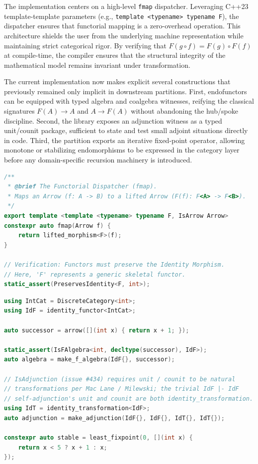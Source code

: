 \documentclass[11pt, a4paper]{report}
\begin{document}
The implementation centers on a high-level \texttt{fmap} dispatcher. Leveraging C++23 template-template parameters (e.g., \texttt{template <typename> typename F}), the dispatcher ensures that functorial mapping is a zero-overhead operation. This architecture shields the user from the underlying machine representation while maintaining strict categorical rigor. By verifying that $F(g \circ f) = F(g) \circ F(f)$ at compile-time, the compiler ensures that the structural integrity of the mathematical model remains invariant under transformation.

The current implementation now makes explicit several constructions that previously remained only implicit in downstream partitions. First, endofunctors can be equipped with typed algebra and coalgebra witnesses, reifying the classical signatures $F(A) \to A$ and $A \to F(A)$ without abandoning the hub/spoke discipline. Second, the library exposes an adjunction witness as a typed unit/counit package, sufficient to state and test small adjoint situations directly in code. Third, the partition exports an iterative fixed-point operator, allowing monotone or stabilizing endomorphisms to be expressed in the category layer before any domain-specific recursion machinery is introduced.

\begin{lstlisting}[language=C++, caption={Functorial Mapping: Mappings as zero-overhead dispatchers.}, label={lst:functor_fmap}]
/** 
 * @brief The Functorial Dispatcher (fmap).
 * Maps an Arrow (f: A -> B) to a lifted Arrow (F(f): F<A> -> F<B>).
 */
export template <template <typename> typename F, IsArrow Arrow>
constexpr auto fmap(Arrow f) {
    return lifted_morphism<F>(f);
}

// Verification: Functors must preserve the Identity Morphism.
// Here, 'F' represents a generic skeletal functor.
static_assert(PreservesIdentity<F, int>);
\end{lstlisting}

\begin{lstlisting}[language=C++, caption={Endofunctor algebras, adjunction witnesses, and fixed points.}, label={lst:functor_algebra_fixpoint}]
using IntCat = DiscreteCategory<int>;
using IdF = identity_functor<IntCat>;

auto successor = arrow([](int x) { return x + 1; });

static_assert(IsFAlgebra<int, decltype(successor), IdF>);
auto algebra = make_f_algebra(IdF{}, successor);

// IsAdjunction (issue #434) requires unit / counit to be natural
// transformations per Mac Lane / Milewski; the trivial IdF |- IdF
// self-adjunction's unit and counit are both identity_transformation.
using IdT = identity_transformation<IdF>;
auto adjunction = make_adjunction(IdF{}, IdF{}, IdT{}, IdT{});

constexpr auto stable = least_fixpoint(0, [](int x) {
    return x < 5 ? x + 1 : x;
});
\end{lstlisting}
\end{document}
